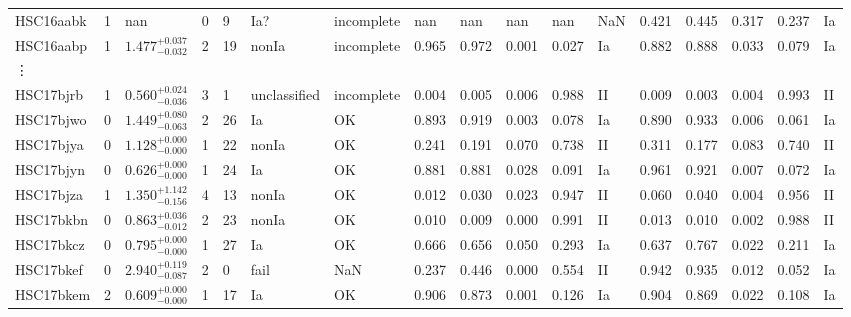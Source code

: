 \documentclass[useamsfonts]{pasj01}
\begin{document}
\begin{table}[htbp]
{\begin{tabular}{p{4em}p{1em}p{4.0em}p{2.1em}|p{0.6em}p{4.0em}p{4.5em}|p{2.9em}|p{1.2em}p{1.2em}p{1.2em}p{0.6em}|p{2.9em}|p{1.2em}p{1.2em}p{1.2em}p{0.6em}}
HSC16aabk &     1 &      nan &         0 &    9 &    Ia? &   incomplete &      nan &      nan &      nan &      nan &     NaN &    0.421 &    0.445 &    0.317 &    0.237 &      Ia \\
HSC16aabp &     1 &    $1.477_{-0.032}^{+0.037}$ &         2 &   19 &  nonIa &   incomplete &    0.965 &    0.972 &    0.001 &    0.027 &      Ia &    0.882 &    0.888 &    0.033 &    0.079 &      Ia \\
\vdots & & & & & & & & & & & & & & & &\\
HSC17bjrb &     1 &    $0.560_{-0.036}^{+0.024}$ &         3 &    1 &  unclassified &   incomplete &    0.004 &    0.005 &    0.006 &    0.988 &      II &    0.009 &    0.003 &    0.004 &    0.993 &      II \\
HSC17bjwo &     0 &    $1.449_{-0.063}^{+0.080}$ &         2 &   26 &     Ia &     OK &    0.893 &    0.919 &    0.003 &    0.078 &      Ia &    0.890 &    0.933 &    0.006 &    0.061 &      Ia \\
HSC17bjya &     0 &    $1.128_{-0.000}^{+0.000}$ &         1 &   22 &  nonIa &     OK &    0.241 &    0.191 &    0.070 &    0.738 &      II &    0.311 &    0.177 &    0.083 &    0.740 &      II \\
HSC17bjyn &     0 &    $0.626_{-0.000}^{+0.000}$ &         1 &   24 &     Ia &     OK &    0.881 &    0.881 &    0.028 &    0.091 &      Ia &    0.961 &    0.921 &    0.007 &    0.072 &      Ia \\
HSC17bjza &     1 &    $1.350_{-0.156}^{+1.142}$ &         4 &   13 &  nonIa &     OK &    0.012 &    0.030 &    0.023 &    0.947 &      II &    0.060 &    0.040 &    0.004 &    0.956 &      II \\
HSC17bkbn &     0 &    $0.863_{-0.012}^{+0.036}$ &         2 &   23 &  nonIa &     OK &    0.010 &    0.009 &    0.000 &    0.991 &      II &    0.013 &    0.010 &    0.002 &    0.988 &      II \\
HSC17bkcz &     0 &    $0.795_{-0.000}^{+0.000}$ &         1 &   27 &     Ia &     OK &    0.666 &    0.656 &    0.050 &    0.293 &      Ia &    0.637 &    0.767 &    0.022 &    0.211 &      Ia \\
HSC17bkef &     0 &    $2.940_{-0.087}^{+0.119}$ &         2 &    0 &   fail &    NaN &    0.237 &    0.446 &    0.000 &    0.554 &      II &    0.942 &    0.935 &    0.012 &    0.052 &      Ia \\
HSC17bkem &     2 &    $0.609_{-0.000}^{+0.000}$ &         1 &   17 &     Ia &     OK &    0.906 &    0.873 &    0.001 &    0.126 &      Ia &    0.904 &    0.869 &    0.022 &    0.108 &      Ia \\

\end{tabular}}
\end{table}
\end{document}
